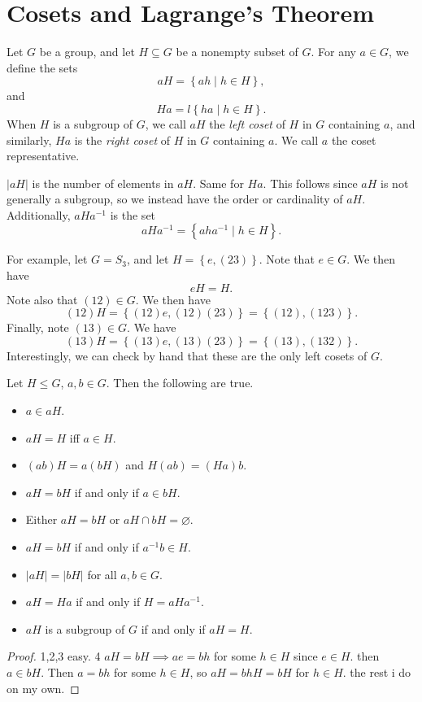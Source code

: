 \chapter{Cosets and Lagrange's Theorem}
\begin{definition}[Coset]\label{dfn:coset}
	Let $G$ be a group, and let $H\subseteq  G$ be a nonempty subset of $G$. For any $a\in G$, we define the sets
	\[
		aH=\left\{ ah \mid h\in H \right\} 
	,\]
	and
	\[
		Ha=l\left\{ ha \mid h\in H \right\} 
	.\] 
	When $H$ is a subgroup of $G$, we call $aH$ the \emph{left coset} of $H$ in $G$ containing $a$, and similarly, $Ha$ is the \emph{right coset} of $H$ in $G$ containing $a$. We call $a$ the coset representative.
\end{definition}
\begin{notation}
	$\left| aH \right| $ is the number of elements in $aH$. Same for $Ha$. This follows since $aH$ is not generally a subgroup, so we instead have the order or cardinality of $aH$. Additionally, $aHa^{-1}$ is the set
	\[
		aHa^{-1}=\left\{ aha^{-1} \mid h\in H \right\} 
	.\]
\end{notation}

For example, let $G=S_3$, and let $H=\left\{ e,(23) \right\} $. Note that $e\in G$. We then have
\[
	e H=H
.\]
Note also that $(12)\in G$. We then have
\[
	(12)H=\left\{ (12)e ,(12)(23) \right\} =\left\{ (12),(123) \right\} 
.\]
Finally, note $(13)\in G$. We have
\[
	(13)H=\left\{ (13)e,(13)(23) \right\} =\left\{ (13),(132) \right\} 
.\]
Interestingly, we can check by hand that these are the only left cosets of $G$.

\begin{proposition}\label{prp:slkj}
	Let $H\leq G$, $a,b\in G$. Then the following are true.
	\begin{itemize}
		\item $a\in aH$.
		\item $aH=H$ iff $a\in H$.
		\item $(ab)H=a(bH)$ and $H(ab)=(Ha)b$.
		\item $aH=bH$ if and only if $a\in bH$.
		\item Either $aH=bH$ or $aH\cap bH=\varnothing$.
		\item $aH=bH$ if and only if $a^{-1}b\in H$.
		\item $\left| aH \right| =\left| bH \right| $ for all $a,b\in  G$.
		\item $aH=Ha$ if and only if $H=aHa^{-1}$.
		\item $aH$ is a subgroup of $G$ if and only if $aH=H$.
	\end{itemize}
\end{proposition}
\begin{proof}
	1,2,3 easy. 4 $aH=bH\implies ae=bh$ for some $h\in H$ since $e\in H$. then $a\in bH$. Then $a=bh$ for some $h\in H$, so $aH=bhH=bH$ for $h\in H$. the rest i do on my own.
\end{proof}
